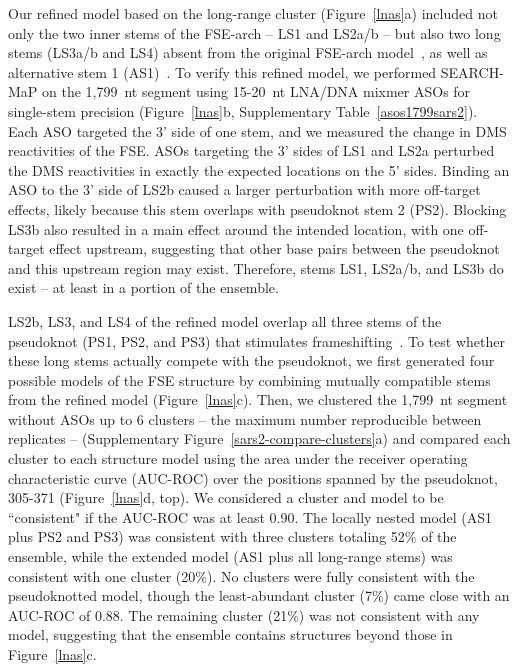 \documentclass[main.tex]{subfiles}
\begin{document}
Our refined model based on the long-range cluster (Figure~\ref{lnas}a) included not only the two inner stems of the FSE-arch -- LS1 and LS2a/b -- but also two long stems (LS3a/b and LS4) absent from the original FSE-arch model~\cite{Ziv2020}, as well as alternative stem 1 (AS1)~\cite{Lan2022}.
To verify this refined model, we performed SEARCH-MaP on the 1,799~nt segment using 15-20~nt LNA/DNA mixmer ASOs for single-stem precision (Figure~\ref{lnas}b, Supplementary Table~\ref{asos1799sars2}).
Each ASO targeted the 3' side of one stem, and we measured the change in DMS reactivities of the FSE.
ASOs targeting the 3' sides of LS1 and LS2a perturbed the DMS reactivities in exactly the expected locations on the 5' sides.
Binding an ASO to the 3' side of LS2b caused a larger perturbation with more off-target effects, likely because this stem overlaps with pseudoknot stem 2 (PS2).
Blocking LS3b also resulted in a main effect around the intended location, with one off-target effect upstream, suggesting that other base pairs between the pseudoknot and this upstream region may exist.
Therefore, stems LS1, LS2a/b, and LS3b do exist -- at least in a portion of the ensemble.

LS2b, LS3, and LS4 of the refined model overlap all three stems of the pseudoknot (PS1, PS2, and PS3) that stimulates frameshifting~\cite{Kelly2020,KZhang2021,Jones2022}.
To test whether these long stems actually compete with the pseudoknot, we first generated four possible models of the FSE structure by combining mutually compatible stems from the refined model (Figure~\ref{lnas}c).
Then, we clustered the 1,799~nt segment without ASOs up to 6 clusters -- the maximum number reproducible between replicates -- (Supplementary Figure~\ref{sars2-compare-clusters}a) and compared each cluster to each structure model using the area under the receiver operating characteristic curve (AUC-ROC) over the positions spanned by the pseudoknot, 305-371 (Figure~\ref{lnas}d, top).
We considered a cluster and model to be ``consistent" if the AUC-ROC was at least 0.90.
The locally nested model (AS1 plus PS2 and PS3) was consistent with three clusters totaling 52\% of the ensemble, while the extended model (AS1 plus all long-range stems) was consistent with one cluster (20\%).
No clusters were fully consistent with the pseudoknotted model, though the least-abundant cluster (7\%) came close with an AUC-ROC of 0.88.
The remaining cluster (21\%) was not consistent with any model, suggesting that the ensemble contains structures beyond those in Figure~\ref{lnas}c.
\end{document}
